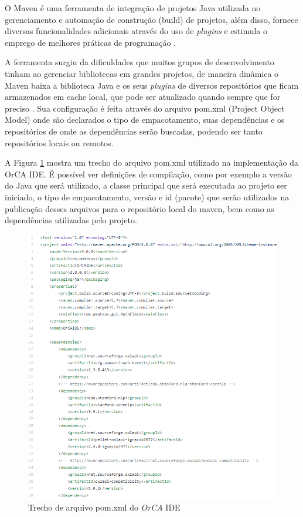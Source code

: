 \documentclass{bcc}
\begin{document}
O Maven é uma ferramenta de integração de projetos Java utilizada no gerenciamento e automação de construção (build) de projetos, além disso, fornece diversas funcionalidades adicionais através do uso de \textit{plugins} e estimula o emprego de melhores práticas de programação \cite{maven}.

A ferramenta surgiu da dificuldades que muitos grupos de desenvolvimento tinham ao gerenciar bibliotecas em grandes projetos, de maneira dinâmica o Maven baixa a biblioteca Java e os seus \textit{plugins} de diversos repositórios que ficam armazenados em cache local, que pode ser atualizado quando sempre que for preciso \cite{oliveira2016}. Sua configuração é feita através do arquivo pom.xml (Project Object Model) onde são declarados o tipo de empacotamento, suas dependências e os repositórios de onde as dependências serão buscadas, podendo ser tanto repositórios locais ou remotos. \cite{junior2014}

A Figura \ref{fig:pom_xml} mostra um trecho do arquivo pom.xml utilizado na implementação da OrCA IDE. É possível ver definições de compilação, como por exemplo a versão do Java que será utilizado, a classe principal que será executada ao projeto ser iniciado, o tipo de empacotamento, versão e id (pacote) que serão utilizados na publicação desses arquivos para o repositório local do maven, bem como as dependências utilizadas pelo projeto.

\begin{figure}[H]
\centering
\includegraphics[width=1\textwidth]{Figuras/pom_xml.png}
\caption{Trecho de arquivo pom.xml do \textit{OrCA} IDE}
\label{fig:pom_xml}
\end{figure}
\end{document}
